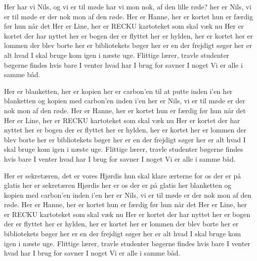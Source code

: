 \documentclass[a4paper,11pt]{article}
\begin{document}
\begin{song}
  Her har vi Nils, og vi er til møde
  har vi mon nok, af den lille røde?
  her er Nils, vi er til møde
  er der nok mon af den røde.
  Her er Hanne, her er kortet
  hun er færdig før hun når det
  Her er Line, her er RECKU
  kartoteket som skal væk nu
  Her er kortet der har nyttet
  her er bogen der er flyttet
  her er hylden, her er kortet
  her er lommen der blev borte
  her er bibliotekets bøger
  her er en der frejdigt søger
  her er alt hvad I skal bruge
  kom igen i næste uge.
  Flittige lærer, travle studenter
  bøgerne findes hvis bare I venter
  hvad har I brug for
  savner I noget
  Vi er alle i samme båd.

  Her er blanketten, her er kopien
  her er carbon'en til at putte inden i'en
  her blanketten og kopien
  med carbon'en inden i'en
  her er Nils, vi er til møde
  er der nok mon af den røde.
  Her er Hanne, her er kortet
  hun er færdig før hun når det
  Her er Line, her er RECKU
  kartoteket som skal væk nu
  Her er kortet der har nyttet
  her er bogen der er flyttet
  her er hylden, her er kortet
  her er lommen der blev borte
  her er bibliotekets bøger
  her er en der frejdigt søger
  her er alt hvad I skal bruge
  kom igen i næste uge.
  Flittige lærer, travle studenter
  bøgerne findes hvis bare I venter
  hvad har I brug for
  savner I noget
  Vi er alle i samme båd.

  Her er sekretæren, det er vores Hjørdis
  hun skal klare ærterne for os der er på glatis
  her er sekretæren Hjørdis
  her er os der er på glatis
  her blanketten og kopien
  med carbon'en inden i'en
  her er Nils, vi er til møde
  er der nok mon af den røde.
  Her er Hanne, her er kortet
  hun er færdig før hun når det
  Her er Line, her er RECKU
  kartoteket som skal væk nu
  Her er kortet der har nyttet
  her er bogen der er flyttet
  her er hylden, her er kortet
  her er lommen der blev borte
  her er bibliotekets bøger
  her er en der frejdigt søger
  her er alt hvad I skal bruge
  kom igen i næste uge.
  Flittige lærer, travle studenter
  bøgerne findes hvis bare I venter
  hvad har I brug for
  savner I noget
  Vi er alle i samme båd.

\end{song}
\end{document}
